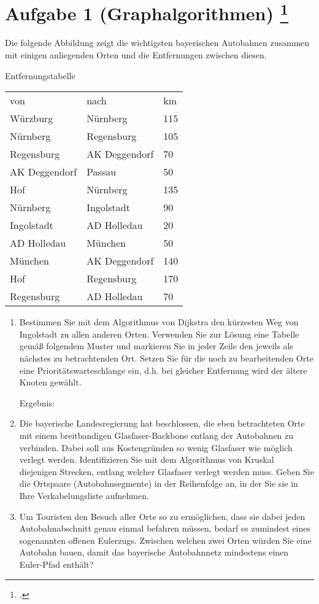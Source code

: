 \documentclass{lehramt-informatik-aufgabe}
\begin{document}
\section{Aufgabe 1 (Graphalgorithmen)
\footcite{66115:2017:03}}

Die folgende Abbildung zeigt die wichtigsten bayerischen Autobahnen
zusammen mit einigen anliegenden Orten und die Entfernungen zwischen
diesen.

Entfernungstabelle

\begin{tabular}{lll}
von & nach & km\\
Würzburg & Nürnberg & 115\\
Nürnberg & Regensburg & 105\\
Regensburg & AK Deggendorf & 70\\
AK Deggendorf & Passau & 50\\
Hof & Nürnberg & 135\\
Nürnberg & Ingolstadt & 90\\
Ingolstadt & AD Holledau & 20\\
AD Holledau & München & 50\\
München & AK Deggendorf & 140\\
Hof & Regensburg & 170\\
Regensburg & AD Holledau & 70\\
\end{tabular}

\begin{enumerate}


\item Bestimmen Sie mit dem Algorithmus von Dijkstra den kürzesten Weg
von Ingolstadt zu allen anderen Orten. Verwenden Sie zur Lösung eine
Tabelle gemäß folgendem Muster und markieren Sie in jeder Zeile den
jeweils als nächstes zu betrachtenden Ort. Setzen Sie für die noch zu
bearbeitenden Orte eine Prioritätswarteschlange ein, d.h. bei gleicher
Entfernung wird der ältere Knoten gewählt.

Ergebnis:


\item Die bayerische Landesregierung hat beschlossen, die eben
betrachteten Orte mit einem breitbandigen Glasfaser-Backbone entlang der
Autobahnen zu verbinden. Dabei soll aus Kostengründen so wenig Glasfaser
wie möglich verlegt werden. Identifizieren Sie mit dem Algorithmus von
Kruskal diejenigen Strecken, entlang welcher Glasfaser verlegt werden
muss. Geben Sie die Ortspaare (Autobahnsegmente) in der Reihenfolge an,
in der Sie sie in Ihre Verkabelungsliste aufnehmen.

\item Um Touristen den Besuch aller Orte so zu ermöglichen, dass sie
dabei jeden Autobahnabschnitt genau einmal befahren müssen, bedarf es
zumindest eines sogenannten offenen Eulerzugs. Zwischen welchen zwei
Orten würden Sie eine Autobahn bauen, damit das bayerische Autobahnnetz
mindestens einen Euler-Pfad enthält?
\end{enumerate}
\end{document}
